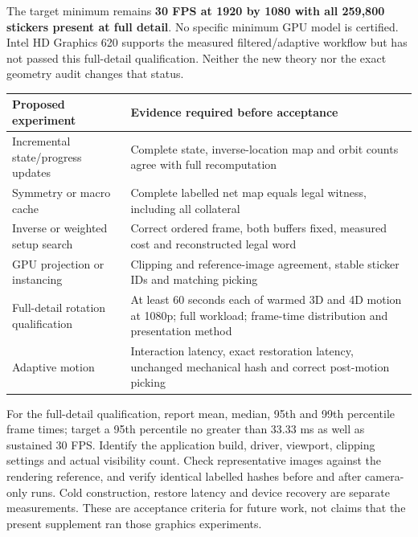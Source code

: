 \documentclass[
  10pt,
  a4paper,
]{article}
\newcounter{none} %
\begin{document}
The target minimum remains \textbf{30 FPS at 1920 by 1080 with all
259,800 stickers present at full detail}. No specific minimum GPU model
is certified. Intel HD Graphics 620 supports the measured
filtered/adaptive workflow but has not passed this full-detail
qualification. Neither the new theory nor the exact geometry audit
changes that status.

{\def\LTcaptype{none} %
\begin{longtable}[]{@{}
  >{\raggedright\arraybackslash}p{}
  >{\raggedright\arraybackslash}p{}@{}}
\toprule\noalign{}
\begin{minipage}[b]{\linewidth}\raggedright
Proposed experiment
\end{minipage} & \begin{minipage}[b]{\linewidth}\raggedright
Evidence required before acceptance
\end{minipage} \\
\midrule\noalign{}
\endhead
\bottomrule\noalign{}
\endlastfoot
Incremental state/progress updates & Complete state, inverse-location
map and orbit counts agree with full recomputation \\
Symmetry or macro cache & Complete labelled net map equals legal
witness, including all collateral \\
Inverse or weighted setup search & Correct ordered frame, both buffers
fixed, measured cost and reconstructed legal word \\
GPU projection or instancing & Clipping and reference-image agreement,
stable sticker IDs and matching picking \\
Full-detail rotation qualification & At least 60 seconds each of warmed
3D and 4D motion at 1080p; full workload; frame-time distribution and
presentation method \\
Adaptive motion & Interaction latency, exact restoration latency,
unchanged mechanical hash and correct post-motion picking \\
\end{longtable}
}

For the full-detail qualification, report mean, median, 95th and 99th
percentile frame times; target a 95th percentile no greater than 33.33
ms as well as sustained 30 FPS. Identify the application build, driver,
viewport, clipping settings and actual visibility count. Check
representative images against the rendering reference, and verify
identical labelled hashes before and after camera-only runs. Cold
construction, restore latency and device recovery are separate
measurements. These are acceptance criteria for future work, not claims
that the present supplement ran those graphics experiments.
\end{document}
